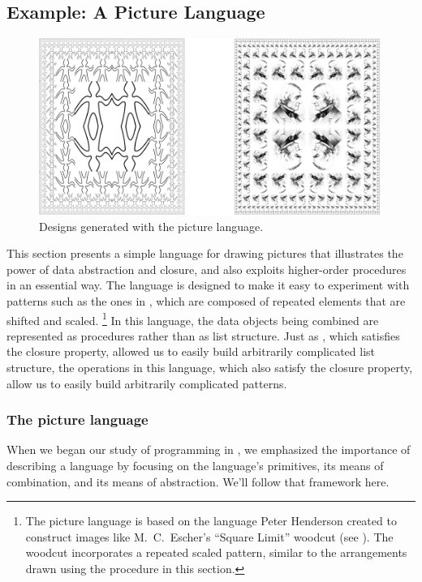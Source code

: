 \subsection{Example: A Picture Language}
\label{Section 2.2.4}

\begin{figure}[tb]
	\centering
	\includegraphics[width=111mm]{fig/chap2/Fig2.9-bigger.png}
	\caption{
		Designs generated with the picture language.
	}
	\label{Figure 2.9}
\end{figure}

This section presents a simple language for drawing pictures that illustrates the power of data abstraction and closure, and also exploits higher-order procedures in an essential way.
The language is designed to make it easy to experiment with patterns such as the ones in , which are composed of repeated elements that are shifted and scaled.%
\footnote{
	The picture language is based on the language Peter Henderson created to construct images like M.~C.~Escher’s “Square Limit” woodcut (see ).
	The woodcut incorporates a repeated scaled pattern, similar to the arrangements drawn using the  procedure in this section.
}
In this language, the data objects being combined are represented as procedures rather than as list structure.
Just as , which satisfies the closure property, allowed us to easily build arbitrarily complicated list structure, the operations in this language, which also satisfy the closure property, allow us to easily build arbitrarily complicated patterns.



\subsubsection*{The picture language}

When we began our study of programming in , we emphasized the importance of describing a language by focusing on the language’s primitives, its means of combination, and its means of abstraction.
We’ll follow that framework here.

